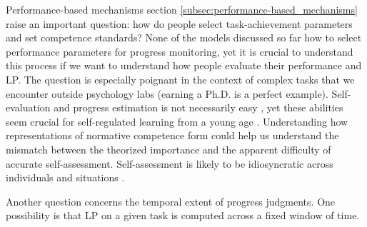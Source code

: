 Performance-based mechanisms section \autoref{subsec:performance-based_mechanisms} raise an important question: how do people select task-achievement parameters and set competence standards? None of the models discussed so far how to select performance parameters for progress monitoring, yet it is crucial to understand this process if we want to understand how people evaluate their performance and \ac{LP}. The question is especially poignant in the context of complex tasks that we encounter outside psychology labs (earning a Ph.D. is a perfect example). Self-evaluation and progress estimation is not necessarily easy \cite{townsend_judgments_2011,raaijmakers_effects_2019}, yet these abilities seem crucial for self-regulated learning from a young age \cite{oudeyer_computational_2018}. Understanding how representations of normative competence form could help us understand the mismatch between the theorized importance and the apparent difficulty of accurate self-assessment. Self-assessment is likely to be idiosyncratic across individuals and situations \cite{boekaerts_subjective_1991}.

Another question concerns the temporal extent of progress judgments. One possibility is that \ac{LP} on a given task is computed across a fixed window of time. 




